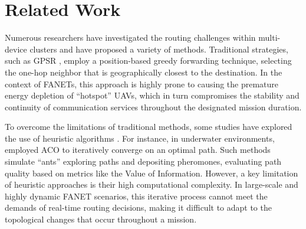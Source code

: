 \documentclass[runningheads]{llncs}
\begin{document}
\section{Related Work}
\label{s2}
Numerous researchers have investigated the routing challenges within multi-device clusters and have proposed a variety of methods. Traditional strategies, such as GPSR \cite{gpsr}, employ a position-based greedy forwarding technique, selecting the one-hop neighbor that is geographically closest to the destination. In the context of FANETs, this approach is highly prone to causing the premature energy depletion of ``hotspot'' UAVs, which in turn compromises the stability and continuity of communication services throughout the designated mission duration.

To overcome the limitations of traditional methods, some studies have explored the use of heuristic algorithms \cite{intro12}. For instance, in underwater environments, \cite{aco} employed ACO to iteratively converge on an optimal path. Such methods simulate ``ants'' exploring paths and depositing pheromones, evaluating path quality based on metrics like the Value of Information. However, a key limitation of heuristic approaches is their high computational complexity. In large-scale and highly dynamic FANET scenarios, this iterative process cannot meet the demands of real-time routing decisions, making it difficult to adapt to the topological changes that occur throughout a mission.
\end{document}
